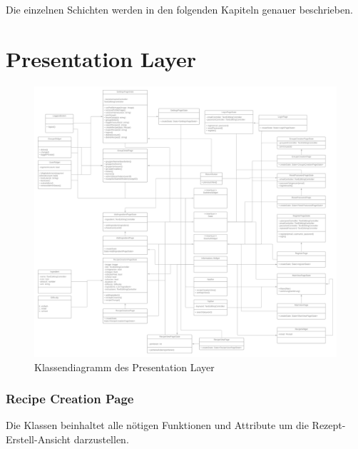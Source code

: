 \documentclass[parskip=full]{scrartcl}
\begin{document}
Die einzelnen Schichten werden in den folgenden Kapiteln genauer beschrieben.

\newpage
\section{Presentation Layer}
\begin{figure}[htp]
    \centering
    \includegraphics[width = \textwidth]{images/presentationLayer/presentationLayer.png}
    \caption{Klassendiagramm des Presentation Layer}
    \label{fig:presentation-layer}
\end{figure}

    \newpage
    \subsubsection{Recipe Creation Page}
        Die Klassen beinhaltet alle nötigen Funktionen und Attribute um die Rezept-Erstell-Ansicht darzustellen.\newline
\end{document}
